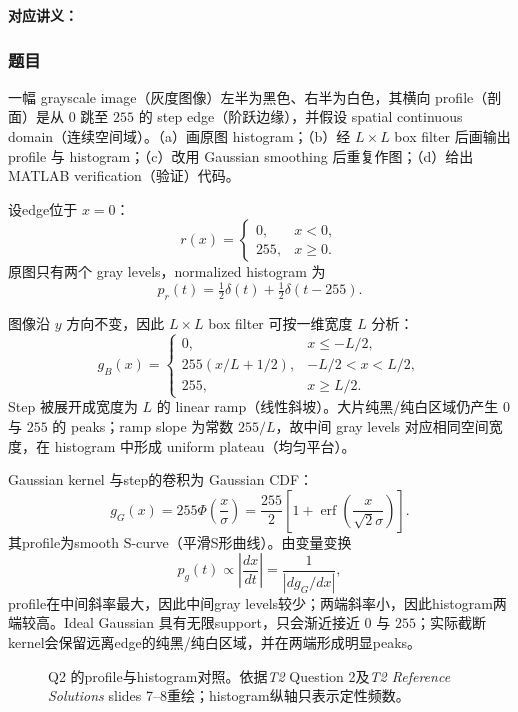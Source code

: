 \textbf{对应讲义：}

\subsubsection*{题目}

一幅 grayscale image（灰度图像）左半为黑色、右半为白色，其横向 profile（剖面）是从 $0$ 跳至 $255$ 的 step edge（阶跃边缘），并假设 spatial continuous domain（连续空间域）。（a）画原图 histogram；（b）经 $L\times L$ box filter 后画输出 profile 与 histogram；（c）改用 Gaussian smoothing 后重复作图；（d）给出 MATLAB verification（验证）代码。

\begin{checkedsolution}
设edge位于 $x=0$：
\[
  r(x)=
  \begin{cases}
    0,&x<0,\\
    255,&x\ge0.
  \end{cases}
\]
原图只有两个 gray levels，normalized histogram 为
\[
  p_r(t)=\tfrac12\delta(t)+\tfrac12\delta(t-255).
\]

图像沿 $y$ 方向不变，因此 $L\times L$ box filter 可按一维宽度 $L$ 分析：
\[
  g_B(x)=
  \begin{cases}
    0,&x\le-L/2,\\[1mm]
    255\left(x/L+1/2\right),&-L/2<x<L/2,\\[1mm]
    255,&x\ge L/2.
  \end{cases}
\]
Step 被展开成宽度为 $L$ 的 linear ramp（线性斜坡）。大片纯黑/纯白区域仍产生 $0$ 与 $255$ 的 peaks；ramp slope 为常数 $255/L$，故中间 gray levels 对应相同空间宽度，在 histogram 中形成 uniform plateau（均匀平台）。

Gaussian kernel 与step的卷积为 Gaussian CDF：
\[
  g_G(x)=255\Phi\!\left(\frac{x}{\sigma}\right)
  =\frac{255}{2}\left[1+\operatorname{erf}\!\left(\frac{x}{\sqrt2\sigma}\right)\right].
\]
其profile为smooth S-curve（平滑S形曲线）。由变量变换
\[
  p_g(t)\propto\left|\frac{dx}{dt}\right|
  =\frac{1}{|dg_G/dx|},
\]
profile在中间斜率最大，因此中间gray levels较少；两端斜率小，因此histogram两端较高。Ideal Gaussian 具有无限support，只会渐近接近 $0$ 与 $255$；实际截断kernel会保留远离edge的纯黑/纯白区域，并在两端形成明显peaks。

\begin{figure}[htbp]
  \centering
  \resizebox{0.98\textwidth}{!}{}
  \caption{Q2 的profile与histogram对照。依据\textit{T2} Question 2及\textit{T2 Reference Solutions} slides 7--8重绘；histogram纵轴只表示定性频数。}
  \label{fig:sc4061-tut02-filter-profiles}
\end{figure}


\end{checkedsolution}
